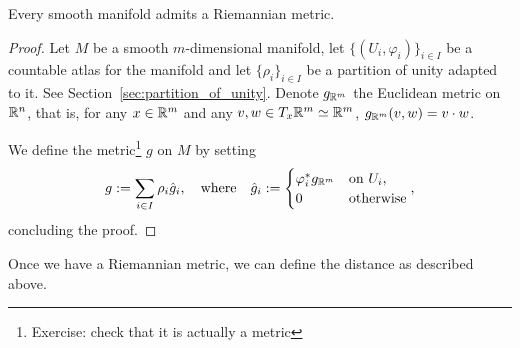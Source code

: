 \begin{theorem}
  Every smooth manifold admits a Riemannian metric.
\end{theorem}
\begin{proof}
  Let $M$ be a smooth $m$-dimensional manifold, let $\{(U_i, \varphi_i)\}_{i\in I}$ be a countable atlas for the manifold and let $\{\rho_i\}_{i\in I}$ be a partition of unity adapted to it. See Section~\ref{sec:partition_of_unity}.
  Denote $g_{\mathbb{R}^m}$ the Euclidean metric on $\mathbb{R}^n$, that is, for any $x \in \mathbb{R}^m$ and any $v,w \in T_x\mathbb{R}^m\simeq\mathbb{R}^m$, $g_{\mathbb{R}^m}(v, w) = v \cdot w$.

  We define the metric\footnote{Exercise: check that it is actually a metric} $g$ on $M$ by setting
  \begin{align}
    g := \sum_{i\in I} \rho_i \hat{g}_i,
    \quad\mbox{where}\quad
    \hat{g}_i := \begin{cases}
      \varphi_i^* g_{\mathbb{R}^m} & \mbox{on } U_i, \\
      0 & \mbox{otherwise}
    \end{cases},
  \end{align}
  concluding the proof.
\end{proof}

Once we have a Riemannian metric, we can define the distance as described above.

